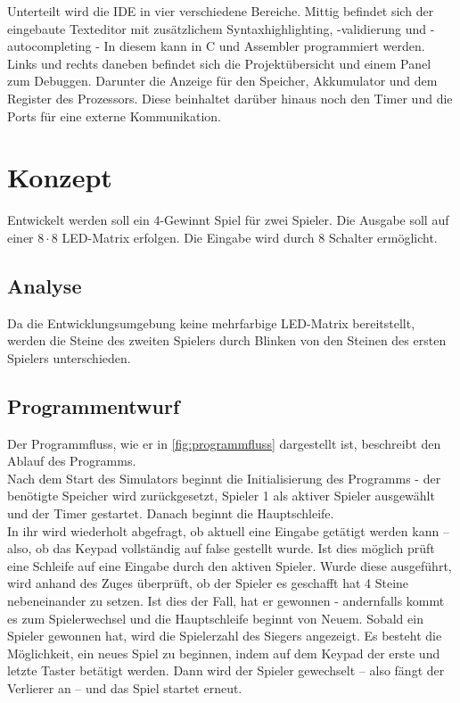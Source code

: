Unterteilt wird die IDE in vier verschiedene Bereiche. Mittig befindet sich der eingebaute Texteditor mit zusätzlichem Syntaxhighlighting, -validierung und -autocompleting - In diesem kann in C und Assembler programmiert werden. Links und rechts daneben befindet sich die Projektübersicht und einem Panel zum Debuggen. Darunter die Anzeige für den Speicher, Akkumulator und dem Register des Prozessors. Diese beinhaltet darüber hinaus noch den Timer und die Ports für eine externe Kommunikation.

\chapter{Konzept}

Entwickelt werden soll ein 4-Gewinnt Spiel für zwei Spieler.
Die Ausgabe soll auf einer $8 \cdot 8$ LED-Matrix erfolgen.
Die Eingabe wird durch 8 Schalter ermöglicht.

\section{Analyse}

Da die Entwicklungsumgebung keine mehrfarbige LED-Matrix bereitstellt, werden die Steine des zweiten Spielers durch Blinken von den Steinen des ersten Spielers unterschieden.

\section{Programmentwurf}

Der Programmfluss, wie er in \autoref{fig:programmfluss} dargestellt ist, beschreibt den Ablauf des Programms.\\
Nach dem Start des Simulators beginnt die Initialisierung des Programms - der benötigte Speicher wird zurückgesetzt, Spieler 1 als aktiver Spieler ausgewählt und der Timer gestartet. Danach beginnt die Hauptschleife.\\
In ihr wird wiederholt abgefragt, ob aktuell eine Eingabe getätigt werden kann -- also, ob das Keypad vollständig auf false gestellt wurde.
Ist dies möglich prüft eine Schleife auf eine Eingabe durch den aktiven Spieler.
Wurde diese ausgeführt, wird anhand des Zuges überprüft, ob der Spieler es geschafft hat 4 Steine nebeneinander zu setzen.
Ist dies der Fall, hat er gewonnen - andernfalls kommt es zum Spielerwechsel und die Hauptschleife beginnt von Neuem.
Sobald ein Spieler gewonnen hat, wird die Spielerzahl des Siegers angezeigt.
Es besteht die Möglichkeit, ein neues Spiel zu beginnen, indem auf dem Keypad der erste und letzte Taster betätigt werden.
Dann wird der Spieler gewechselt -- also fängt der Verlierer an -- und das Spiel startet erneut.

